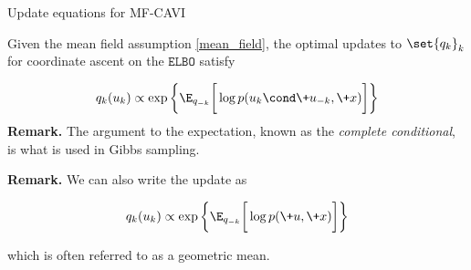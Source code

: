 \documentclass[10pt]{beamer}
\renewcommand{\ELBO}{\texttt{ELBO}}
\begin{document}
\begin{frame}{Update equations for MF-CAVI}

Given the mean field assumption \eqref{mean_field}, the optimal updates to $\set{q_k}_k$ for coordinate ascent on the $\ELBO$ satisfy 
 
\begin{equation} \label{mfcavi_update}
q_k(u_k) \propto \exp \bigg\{ \E_{q_{-k}} \bigg[  \log p(u_k \cond \+u_{-k}, \+x)\bigg] \bigg\}
\end{equation}
\vfill \vfill 
\pause 
\colorbox{blue!30}{\textbf{Remark.}} The argument to the expectation, known as the \textit{complete conditional}, is what is used in Gibbs sampling.  %

\vfill \vfill 
\pause 

\colorbox{blue!30}{\textbf{Remark.}} We can also write the update as

\begin{equation} 
q_k(u_k) \propto \exp \bigg\{ \E_{q_{-k}} \bigg[  \log p(\+u, \+x)\bigg] \bigg\}
\label{eqn:mfcavi_update_2}
\end{equation}

which is often referred to as a  \alert{geometric mean}.

%
%


\end{frame}
\end{document}
